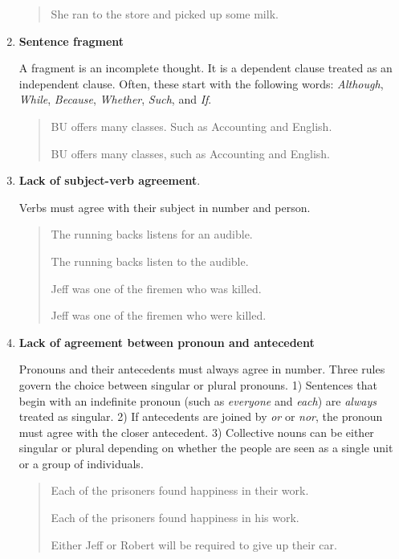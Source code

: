 \begin{enumerate}
\begin{quote}
She ran to the store and picked up some milk. 
\end{quote}


\item \textbf{Sentence fragment}

A fragment is an incomplete thought. It is a dependent clause treated
as an independent clause. Often, these start with the following words:
\emph{Although}, \emph{While}, \emph{Because}, \emph{Whether}, \emph{Such},
and \emph{If}.

\begin{quote}
BU offers many classes. Such as Accounting and English. 

BU offers many classes, such as Accounting and English. 
\end{quote}

\item\textbf{Lack of subject-verb agreement}.

Verbs must agree with their subject in number and person.

\begin{quote}
The running backs listens for an audible. 

The running backs listen to the audible. 

\medskip

Jeff was one of the firemen who was killed. 

Jeff was one of the firemen who were killed. 
\end{quote}

\item \textbf{Lack of agreement between pronoun and antecedent}

Pronouns and their antecedents must always agree in number. Three 
rules govern the choice between singular or plural pronouns. 1) Sentences that begin
with an indefinite pronoun (such as \emph{everyone} and \emph{each}) are \emph{always}
treated as singular. 2) If antecedents are joined by \emph{or} or \emph{nor}, 
the pronoun must agree with the closer antecedent. 3) Collective nouns can be either 
singular or plural depending on whether the people are seen as a single unit or a 
group of individuals.

\begin{quote}
Each of the prisoners found happiness in their work. 

Each of the prisoners found happiness in his work. 
\medskip

Either Jeff or Robert will be required to give up their car. 


\end{quote}
\end{enumerate}
